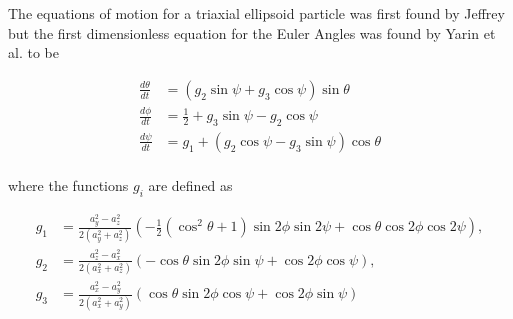 The equations of motion for a triaxial ellipsoid particle was first found by Jeffrey \cite{Jeffrey} but the first dimensionless	 equation for the Euler Angles was found by Yarin et al. \cite{Yarin} to be

\begin{subequations}
\begin{align}
\frac{d\theta}{dt} 	&= (g_2 \sin \psi + g_3 \cos \psi ) \sin \theta \\
\frac{d\phi}{dt} 	&= \tfrac{1}{2} + g_3\sin \psi - g_2 \cos \psi\\
\frac{d\psi}{dt}	&= g_1 + (g_2\cos \psi - g_3\sin \psi) \cos \theta \\
\end{align}
\end{subequations}

where the functions  $g_i$ are defined as

\begin{subequations}
\begin{align}
g_1 &= \frac{a_y^2 - a_z^2}{2(a_y^2 + a_z^2)} 
		\left(-\tfrac{1}{2}(\cos^2 \theta + 1 )\sin 2\phi \sin 2\psi + \cos\theta \cos 2\phi \cos 2\psi \right), \\
g_2 &= \frac{a_z^2 - a_x^2}{2(a_x^2 + a_z^2)}
		\left( -\cos\theta \sin 2\phi \sin\psi  +  \cos 2\phi \cos\psi \right), \\
g_3 &= \frac{a_x^2 - a_y^2}{2(a_x^2 + a_y^2)}
		\left( \cos\theta \sin 2\phi \cos\psi + \cos 2\phi \sin\psi \right)
\end{align}
\end{subequations}

